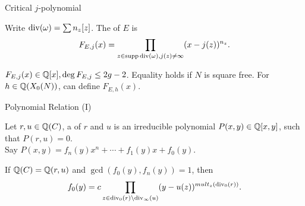 \documentclass[handout]{beamer}
\begin{document}
\begin{frame}{Critical $j$-polynomial}




\pause 
\begin{Def}
Write $\operatorname{div}(\omega) = \sum n_z[z]$. The  of $E$ is 
\[
F_{E,j}(x) = \prod_{z \in \operatorname{supp} \operatorname{div}(\omega), j(z) \neq \infty}(x-j(z))^{n_z}.
\]
\end{Def}
$F_{E,j}(x) \in \mathbb{Q}[x], \deg F_{E,j} \leq 2g-2$. Equality holds if $N$ is square free. For $h \in \mathbb{Q}(X_0(N))$, can define $F_{E,h}(x)$. 
\end{frame}


\begin{frame}{Polynomial Relation (I)}

Let $r, u \in \mathbb{Q}(C)$, a  of $r$ and $u$ is an irreducible polynomial $P(x,y) \in \mathbb{Q}[x,y]$, such that $P(r,u) = 0$.  \\

Say $P(x,y) = f_n(y)x^n + \cdots + f_1(y)x + f_0(y)$. 


\begin{Prop}[C.]
\label{mult}
If $\mathbb{Q}(C) = \mathbb{Q}(r,u)$ and $\gcd(f_0(y), f_n(y)) = 1$, then 
\[
		f_0(y) = c \prod_{z \in\operatorname{div}_{0}(r) \setminus \operatorname{div}_{\infty}(u)} (y - u(z))^{mult_z(\operatorname{div}_0(r))}.
\]
\end{Prop}


\end{frame}
\end{document}
